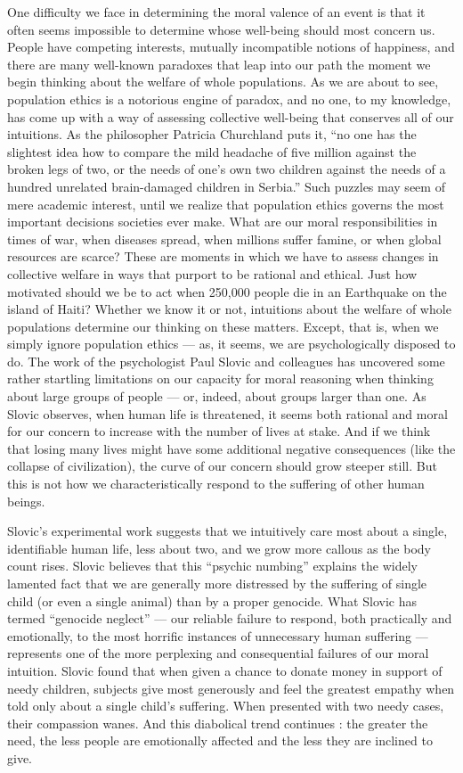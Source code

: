 \documentclass[a4paper,14pt]{extarticle}
\begin{document}
One difficulty we face in determining the moral valence of an event is that it often seems impossible to determine whose well-being should most concern us.
People have competing interests, mutually incompatible notions of happiness, and there are many well-known paradoxes that leap into our path the moment we begin thinking about the welfare of whole populations.
As we are about to see, population ethics is a notorious engine of paradox, and no one, to my knowledge, has come up with a way of assessing collective well-being that conserves all of our intuitions.
As the philosopher Patricia Churchland puts it, ``no one has the slightest idea how to compare the mild headache of five million against the broken legs of two, or the needs of one's own two children against the needs of a hundred unrelated brain-damaged children in Serbia.''
Such puzzles may seem of mere academic interest, until we realize that population ethics governs the most important decisions societies ever make.
What are our moral responsibilities in times of war, when diseases spread, when millions suffer famine, or when global resources are scarce?
These are moments in which we have to assess changes in collective welfare in ways that purport to be rational and ethical.
Just how motivated should we be to act when 250,000 people die in an Earthquake on the island of Haiti?
Whether we know it or not, intuitions about the welfare of whole populations determine our thinking on these matters.
Except, that is, when we simply ignore population ethics --- as, it seems, we are psychologically disposed to do.
The work of the psychologist Paul Slovic and colleagues has uncovered some rather startling limitations on our capacity for moral reasoning when thinking about large groups of people --- or, indeed, about groups larger than one.
As Slovic observes, when human life is threatened, it seems both rational and moral for our concern to increase with the number of lives at stake.
And if we think that losing many lives might have some additional negative consequences (like the collapse of civilization), the curve of our concern should grow steeper still.
But this is not how we characteristically respond to the suffering of other human beings.

Slovic's experimental work suggests that we intuitively care most about a single, identifiable human life, less about two, and we grow more callous as the body count rises.
Slovic believes that this ``psychic numbing'' explains the widely lamented fact that we are generally more distressed by the suffering of single child (or even a single animal) than by a proper genocide.
What Slovic has termed ``genocide neglect'' --- our reliable failure to respond, both practically and emotionally, to the most horrific instances of unnecessary human suffering --- represents one of the more perplexing and consequential failures of our moral intuition.
Slovic found that when given a chance to donate money in support of needy children, subjects give most generously and feel the greatest empathy when told only about a single child's suffering.
When presented with two needy cases, their compassion wanes.
And this diabolical trend continues :
the greater the need, the less people are emotionally affected and the less they are inclined to give.
\end{document}

